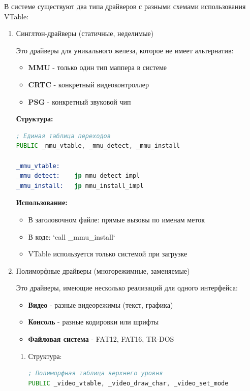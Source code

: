 \documentclass[11pt,a4paper]{scrartcl}
\begin{document}
В системе существуют два типа драйверов с разными схемами использования VTable:
\begin{enumerate}
\item Синглтон-драйверы (статичные, неделимые)
\label{sec:orgfe3b9a9}

Это драйверы для уникального железа, которое не имеет альтернатив:
\begin{itemize}
\item \textbf{MMU} - только один тип маппера в системе
\item \textbf{CRTC} - конкретный видеоконтроллер
\item \textbf{PSG} - конкретный звуковой чип
\end{itemize}

\textbf{Структура:}

\begin{lstlisting}[language=asm,numbers=none]
; Единая таблица переходов
PUBLIC _mmu_vtable, _mmu_detect, _mmu_install

_mmu_vtable:
_mmu_detect:    jp mmu_detect_impl
_mmu_install:   jp mmu_install_impl
\end{lstlisting}

\textbf{\textbf{Использование:}}

\begin{itemize}
\item В заголовочном файле: прямые вызовы по именам меток
\item В коде: `call \_mmu\_install`
\item VTable используется только системой при загрузке
\end{itemize}
\item Полиморфные драйверы (многорежимные, заменяемые)
\label{sec:orgac527eb}

Это драйверы, имеющие несколько реализаций для одного интерфейса:
\begin{itemize}
\item \textbf{Видео} - разные видеорежимы (текст, графика)
\item \textbf{Консоль} - разные кодировки или шрифты
\item \textbf{Файловая система} - FAT12, FAT16, TR-DOS
\end{itemize}
\begin{enumerate}
\item Структура:
\label{sec:org1cde18c}

\begin{lstlisting}[language=asm,numbers=none]
; Полиморфная таблица верхнего уровня
PUBLIC _video_vtable, _video_draw_char, _video_set_mode


\end{lstlisting}
\end{enumerate}
\end{enumerate}
\end{document}
